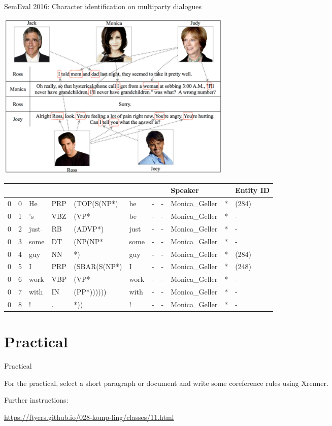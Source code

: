 \documentclass[dvipsnames, 10pt, compress]{beamer}
\begin{document}
\begin{frame}{SemEval 2016: Character identification on multiparty dialogues}

\begin{center}
  \includegraphics[width=0.5\textwidth]{graphics/coref-friends.png}
\end{center}


{\scriptsize
\begin{tabular}{lllllllllll} 
   &   &    &     &             &     &  &   & \textbf{Speaker}  &   & \textbf{Entity ID} \\
  \hline
 0 & 0 & He & PRP & (TOP(S(NP*) & he & - & - & Monica\_Geller & * & (284) \\
  0 & 1 & 's & VBZ & (VP* & be & - & - & Monica\_Geller & * & - \\
  0 & 2 & just & RB & (ADVP*) & just & - & - & Monica\_Geller & * & - \\
  0 & 3 & some & DT & (NP(NP* & some & - & - & Monica\_Geller & * & - \\
  0 & 4 & guy & NN & *) & guy & - & - & Monica\_Geller & * & (284) \\
  0 & 5 & I & PRP & (SBAR(S(NP*) & I & - & - & Monica\_Geller & * & (248) \\
  0 & 6 & work & VBP & (VP* & work & - & - & Monica\_Geller & * & - \\
  0 & 7 & with & IN & (PP*)))))) & with & - & - & Monica\_Geller & * & - \\
  0 & 8 & ! & . & *)) & ! & - & - & Monica\_Geller & * & - \\
\end{tabular}
}


\end{frame}


\section{Practical}

\begin{frame}{Practical}

For the practical, select a short paragraph or document and write some coreference rules 
using Xrenner.

Further instructions:

\url{https://ftyers.github.io/028-komp-ling/classes/11.html}

\end{frame}
\end{document}
